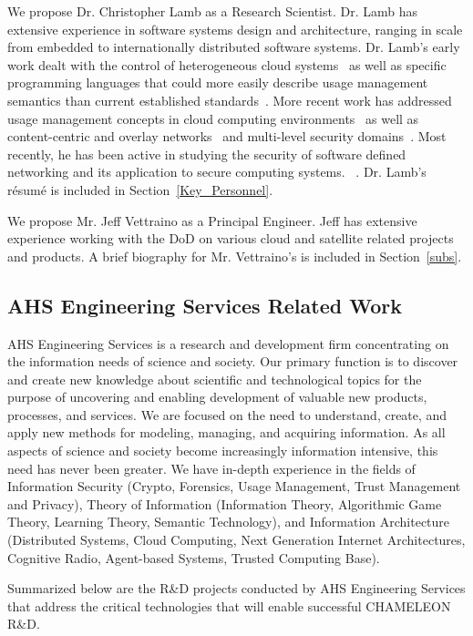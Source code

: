 \documentclass{sbir}
\begin{document}
We propose Dr. Christopher Lamb as a Research Scientist. Dr. Lamb has extensive experience in software systems design and architecture, ranging in scale from embedded to internationally distributed software systems. Dr. Lamb's early work dealt with the control of heterogeneous cloud systems~\cite{LaJaHeAb:11} as well as specific programming languages that could more easily describe usage management semantics than current established standards~\cite{LaJaBoNaHe:11}. More recent work has addressed usage management concepts in cloud computing environments~\cite{JaLaHe:11,JaLaHe:12} as well as content-centric and overlay networks~\cite{LaHe:12b} and multi-level security domains~\cite{LaHe:12,LaHe:13}. Most recently, he has been active in studying the security of software defined networking and its application to secure computing systems. ~\cite{MENS:14}. Dr. Lamb's r\'esum\'e is included in Section~\ref{Key_Personnel}.

We propose Mr. Jeff Vettraino as a Principal Engineer. Jeff has extensive experience working with the DoD on various cloud and satellite related projects and products. A brief biography for Mr. Vettraino's is included in Section~\ref{subs}.

\subsection{AHS Engineering Services Related Work}
AHS Engineering Services is a research and development firm concentrating on the information needs of science and society. Our primary function is to discover and create new knowledge about scientific and technological topics for the purpose of uncovering and enabling development of valuable new products, processes, and services. We are focused on the need to understand, create, and apply new methods for modeling, managing, and acquiring information. As all aspects of science and society become increasingly information intensive, this need has never been greater. We have in-depth experience in the fields of Information Security (Crypto, Forensics, Usage Management, Trust Management and Privacy), Theory of Information (Information Theory, Algorithmic Game Theory, Learning Theory, Semantic Technology), and Information Architecture (Distributed Systems, Cloud Computing, Next Generation Internet Architectures, Cognitive Radio, Agent-based Systems, Trusted Computing Base).

Summarized below are the R\&D projects conducted by AHS Engineering Services that address the critical technologies that will enable successful CHAMELEON R\&D.
\end{document}
